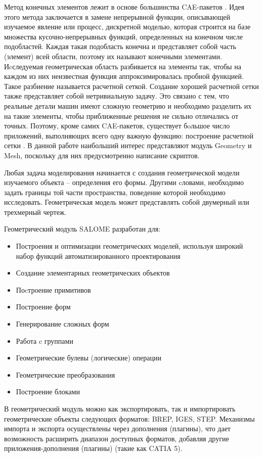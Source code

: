 \documentclass[a4paper,12pt]{article}
\theoremstyle{plain} %
\theoremstyle{definition} %
\theoremstyle{remark} %
\begin{document}
	 Метод конечных элементов лежит в основе большинства CAE-пакетов . Идея этого метода заключается в замене непрерывной функции, описывающей изучаемое явление или процесс, дискретной моделью, которая строится на базе множества кусочно-непрерывных функций, определенных на конечном числе подобластей. Каждая такая подобласть конечна и представляет собой часть (элемент) всей области, поэтому их называют конечными элементами. Иcследуемая геометрическая область разбивается на элементы так, чтобы на каждом из них неизвестная функция аппроксимировалась пробной функцией. Такое разбиение называется расчетной сеткой. Создание хорошей расчетной сетки также представляет собой нетривиальную задачу. Это связано с тем, что реальные детали машин имеют сложную геометрию и необходимо разделить их на такие элементы, чтобы приближенные решения не сильно отличались от точных. Поэтому, кроме самих CAE-пакетов, существует бoльшое число приложений, выполняющих всего одну важную функцию: построение расчетной сетки \cite{wIbmSalome}. В данной работе наибольший интерес представляют модуль Geometry и Mesh, поскольку для них предусмотренно написание скриптов.
	
	Любая задача моделирования начинается с создания геометрической модели изучаемого объекта – определения его формы. Другими cловами, необходимо задать границы той части пространства, поведение которой необходимо исследовать. Геометрическая модель может представлять собой двумерный или трехмерный чертеж.
		
	Геометрический модуль SALOME разработан для:
	\begin{itemize}
		\item Построения и оптимизации геометрических моделей, используя широкий набор функций автоматизированного проектирования
		\item Создание элементарных геометрических объектов
		\item Поcтроение примитивов
		\item Построение форм
		\item Генерирование сложных форм
		\item Работа c группами
		\item Геометрические булевы (логические) операции
		\item Геометрические преобразования
		\item Построение блоками
	\end{itemize}
	
	В геометрический модуль можно как экспортировать, так и импортировать геометрические объекты следующих форматов: BREP, IGES, STEP. Механизмы импорта и экспорта осуществлены через дополнения (плагины), что дает возможность расширить диапазон доступных форматов, добавляя другие приложения-дополнения (плагины) (такие как CATIA 5)\cite{wLadugaGeom}.
	
\end{document}
